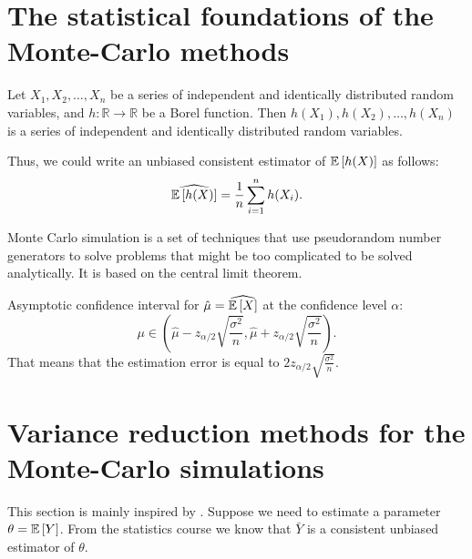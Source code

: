     \section{The statistical foundations of the Monte-Carlo methods}\label{Monte-Carlo:statistical}
        \begin{lemma}
            Let $X_1, X_2, \dots, X_n$ be a series of independent and identically distributed random 
            variables, and $h: \mathbb{R} \to \mathbb{R}$ be a Borel function. Then $h(X_1), h(X_2), \dots, h(X_n)$ 
            is a series of independent and identically distributed random variables.
        \end{lemma}
        \noindent Thus, we could write an unbiased consistent estimator of $\mathbb{E} \left[h(X)\right]$ as follows:
        \begin{equation}
            \widehat{\mathbb{E} \left[h(X)\right]} = \frac{1}{n} \sum_{i=1}^n h(X_i).
        \end{equation}
        \begin{definition}
            Monte Carlo simulation is a set of techniques that use pseudorandom number generators to 
            solve problems that might be too complicated to be solved analytically. It is based on the central limit theorem.
        \end{definition}
        \noindent Asymptotic confidence interval for $\hat{\mu} = \widehat{\mathbb{E}\left[X\right]}$ at the 
        confidence level $\alpha$:
        \begin{equation}
            \mu \in \left(\hat{\mu} - z_{\alpha/2} \sqrt{\frac{\sigma^2}{n}}, \hat{\mu} + z_{\alpha/2} \sqrt{\frac{\sigma^2}{n}}\right).
        \end{equation}
        \noindent That means that the estimation error is equal to $2z_{\alpha/2} \sqrt{\frac{\sigma^2}{n}}$.

    \section{Variance reduction methods for the Monte-Carlo simulations}
        This section is mainly inspired by \cite{KobelkovKitapbayev2022,BoyleGlasserman1997}.
        Suppose we need to estimate a parameter $\theta = \mathbb{E}\left[Y\right]$. 
        From the statistics course we know that $\bar Y$ is a consistent unbiased estimator of $\theta$.  
